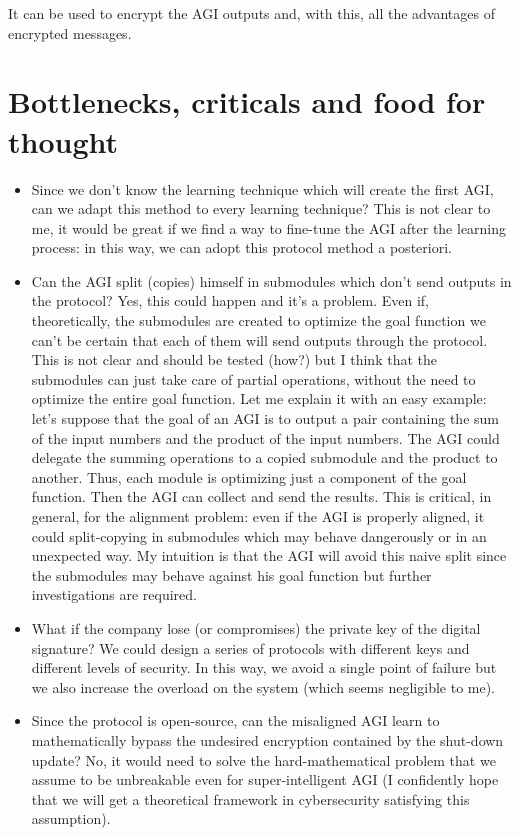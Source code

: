 \documentclass{article}
\begin{document}
It can be used to encrypt the AGI outputs and, with this, all the advantages of encrypted messages.

\section{Bottlenecks, criticals and food for thought}

\begin{itemize}
    \item Since we don't know the learning technique which will create the first AGI, can we adapt this method to every learning technique? This is not clear to me, it would be great if we find a way to fine-tune the AGI after the learning process: in this way, we can adopt this protocol method a posteriori. 

    \item Can the AGI split (copies) himself in submodules which don't send outputs in the protocol? Yes, this could happen and it's a problem. Even if, theoretically, the submodules are created to optimize the goal function we can't be certain that each of them will send outputs through the protocol. 
    This is not clear and should be tested (how?) but I think that the submodules can just take care of partial operations, without the need to optimize the entire goal function. 
    Let me explain it with an easy example: let's suppose that the goal of an AGI is to output a pair containing the sum of the input numbers and the product of the input numbers. The AGI could delegate the summing operations to a copied submodule and the product to another. Thus, each module is optimizing just a component of the goal function. Then the AGI can collect and send the results.
    This is critical, in general, for the alignment problem: even if the AGI is properly aligned, it could split-copying in submodules which may behave dangerously or in an unexpected way.
    My intuition is that the AGI will avoid this naive split since the submodules may behave against his goal function but further investigations are required.

    \item What if the company lose (or compromises) the private key of the digital signature? We could design a series of protocols with different keys and different levels of security. 
    In this way, we avoid a single point of failure but we also increase the overload on the system (which seems negligible to me).
    
    \item Since the protocol is open-source, can the misaligned AGI learn to mathematically bypass the undesired encryption contained by the shut-down update? No, it would need to solve the hard-mathematical problem that we assume to be unbreakable even for super-intelligent AGI (I confidently hope that we will get a theoretical framework in cybersecurity satisfying this assumption).
    
\end{itemize}
    
\end{document}
